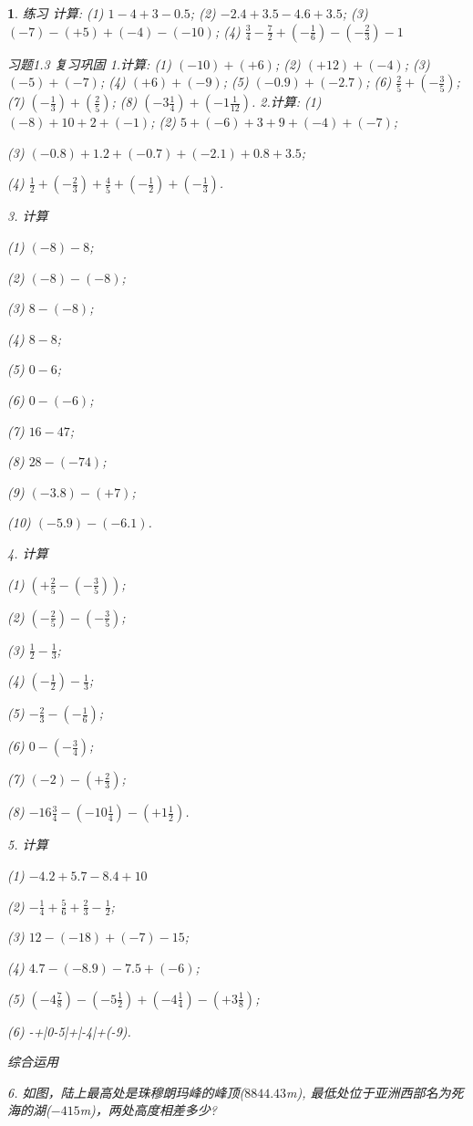 \documentclass[UTF8]{article}
\newtheorem{exercise}{ }
\begin{document}
\begin{exercise}
练习
计算:
(1) $1-4+3-0.5$;
(2) $-2.4+3.5- 4.6+3.5$;
(3) $(-7)-(+5)+(-4)-(-10)$;
(4) $\frac{3}{4} - \frac{7}{2}+(-\frac{1}{6})-(-\frac{2}{3})-1$


习题1.3
复习巩固
1.计算:
	(1) $(-10)+(+6)$;
	(2) $(+12)+(-4)$;
	(3) $(-5)+(-7)$;
	(4) $(+6)+(-9)$;
	(5) $(-0.9)+(-2.7)$;
	(6) $\frac{2}{5}+(-\frac{3}{5})$;
	(7) $(-\frac{1}{3})+(\frac{2}{5})$;
	(8)	$(-3\frac{1}{4})+(-1\frac{1}{12})$.
2.计算:
(1) $(-8)+10+2+(-1)$;
(2) $5+(-6)+3+9+(-4)+(-7)$;

(3) $(-0.8)+1.2+(-0.7)+(-2.1)+0.8+3.5$;

(4) $\frac{1}{2}+(-\frac{2}{3})+\frac{4}{5}+(-\frac{1}{2})+(-\frac{1}{3})$.

3. 计算

(1) $(-8)-8$;

(2) $(-8)-(-8)$;

(3) $8-(-8)$;

(4) $8-8$;

(5) $0-6$;

(6) $0-(-6)$;

(7) $16-47$;

(8) $28-(-74)$;

(9) $(-3.8)-(+7)$;

(10) $(-5.9)-(-6.1)$.

4. 计算

(1) $(+\frac{2}{5}-(-\frac{3}{5}))$;

(2) $(-\frac{2}{5})-(-\frac{3}{5})$;

(3) $\frac{1}{2}-\frac{1}{3}$;

(4) $(-\frac{1}{2})-\frac{1}{3}$;

(5) $-\frac{2}{3}-(-\frac{1}{6})$;

(6) $0-(-\frac{3}{4})$;

(7) $(-2)-(+\frac{2}{3})$;

(8) $-16\frac{3}{4}-(-10\frac{1}{4})-(+1\frac{1}{2})$.

5. 计算

(1) $-4.2+5.7-8.4+10$

(2) $-\frac{1}{4}+\frac{5}{6}+\frac{2}{3}-\frac{1}{2}$;

(3) $12-(-18)+(-7)-15$;

(4) $4.7-(-8.9)-7.5+(-6)$;

(5) $(-4\frac{7}{8})-(-5\frac{1}{2})+(-4\frac{1}{4})-(+3\frac{1}{8})$;

(6) -+\left|0-5\right|+\left|-4\right|+(-9).

综合运用

6. 如图，陆上最高处是珠穆朗玛峰的峰顶($8844.43$m), 最低处位于亚洲西部名为死海的湖($-415$m)，两处高度相差多少?

\end{exercise}
\end{document}
